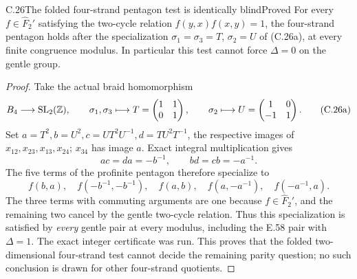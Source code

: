 \begin{statement}{C.26}{The folded four-strand pentagon test is identically blind}{Proved}
For every \(f\in\widehat F_2'\) satisfying the two-cycle
relation \(f(y,x)f(x,y)=1\), the four-strand pentagon
holds after the specialization \(\sigma_1=\sigma_3=T\),
\(\sigma_2=U\) of (C.26a), at every finite congruence
modulus. In particular this test cannot force
\(\Delta=0\) on the gentle group.
\end{statement}
\begin{proof}
Take the actual braid homomorphism
\[
 B_4\longrightarrow{\rm SL}_2(\mathbb Z),\qquad
 \sigma_1,\sigma_3\longmapsto T=
       \begin{pmatrix}1&1\\0&1\end{pmatrix},\qquad
 \sigma_2\longmapsto U=
       \begin{pmatrix}1&0\\-1&1\end{pmatrix}.
 \tag{C.26a}
\]
Set \(a=T^2,b=U^2,c=UT^2U^{-1},d=TU^2T^{-1}\),
the respective images of \(x_{12},x_{23},x_{13},x_{24}\);
\(x_{34}\) has image \(a\). Exact integral multiplication gives
\[
 ac=da=-b^{-1},\qquad bd=cb=-a^{-1}.
 \tag{C.26b}
\]
The five terms of the profinite pentagon
\citep[Introduction, displayed pentagon]{cDolgushevGuynee2024}
therefore specialize to
\[
 f(b,a),\quad f(-b^{-1},-b^{-1}),\quad f(a,b),\quad
 f(a,-a^{-1}),\quad f(-a^{-1},a).
 \tag{C.26c}
\]
The three terms with commuting arguments are one because
\(f\in\widehat F_2'\), and the remaining two cancel by
the gentle two-cycle relation. Thus this specialization
is satisfied by \emph{every} gentle pair at every modulus,
including the E.58 pair with \(\Delta=1\).
The exact integer certificate 
was run. This proves that the folded two-dimensional
four-strand test cannot decide the remaining parity
question; no such conclusion is drawn for other
four-strand quotients.

\end{proof}

